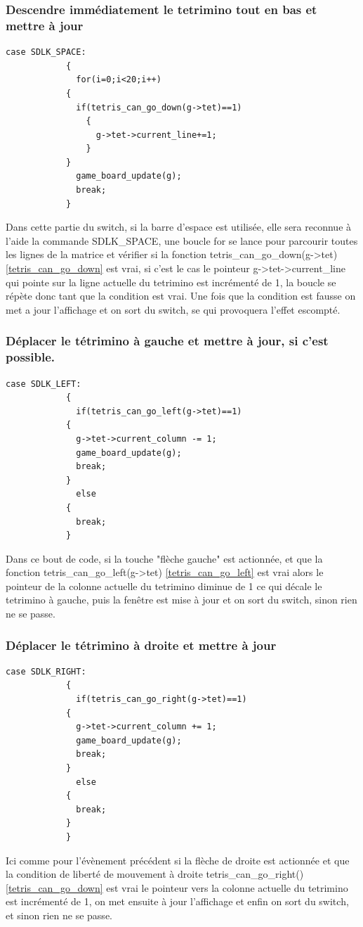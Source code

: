 \documentclass[a4paper,10p]{report}
\begin{document}
\subsubsection{Descendre immédiatement le tetrimino tout en bas et mettre à jour}
\label{down_down}
\begin{lstlisting}
case SDLK_SPACE:
		    {
		      for(i=0;i<20;i++)
			{
			  if(tetris_can_go_down(g->tet)==1)
			    {
			      g->tet->current_line+=1;
			    }
			}
		      game_board_update(g);
		      break;
		    }
\end{lstlisting}
Dans cette partie du switch, si la barre d'espace est utilisée, elle sera reconnue à l'aide la commande SDLK\_SPACE, une boucle for se lance pour parcourir toutes les lignes de la matrice et vérifier si la fonction tetris\_can\_go\_down(g->tet) \ref{tetris_can_go_down} est vrai, si c'est le cas le pointeur g->tet->current\_line qui pointe sur la ligne actuelle du tetrimino est incrémenté de 1, la boucle se répète donc tant que la condition est vrai. Une fois que la condition est fausse on met a jour l'affichage et on sort du switch, se qui provoquera l'effet escompté.

\subsubsection{Déplacer le tétrimino à gauche et mettre à jour, si c’est possible.}
\label{left}
\begin{lstlisting}
case SDLK_LEFT:
		    {
		      if(tetris_can_go_left(g->tet)==1)
			{
			  g->tet->current_column -= 1;
			  game_board_update(g);
			  break;
			}
		      else
			{
			  break;
			}
\end{lstlisting}
Dans ce bout de code, si la touche "flèche gauche" est actionnée, et que la fonction tetris\_can\_go\_left(g->tet) \ref{tetris_can_go_left} est vrai alors le pointeur de la colonne actuelle du tetrimino diminue de 1 ce qui décale le tetrimino à gauche, puis la fenêtre est mise à jour et on sort du switch, sinon rien ne se passe.
\subsubsection{Déplacer le tétrimino à droite et mettre à jour}
\label{right}
\begin{lstlisting}
case SDLK_RIGHT:
		    {
		      if(tetris_can_go_right(g->tet)==1)
			{
			  g->tet->current_column += 1;
			  game_board_update(g);
			  break;
			}
		      else
			{
			  break;
			}
		    }
\end{lstlisting}
Ici comme pour l'évènement précédent si la flèche de droite est actionnée et que la condition de liberté de mouvement à droite tetris\_can\_go\_right() \ref{tetris_can_go_down} est vrai le pointeur vers la colonne actuelle du tetrimino est incrémenté de 1, on met ensuite à jour l'affichage et enfin on sort du switch, et sinon rien ne se passe.
\end{document}
